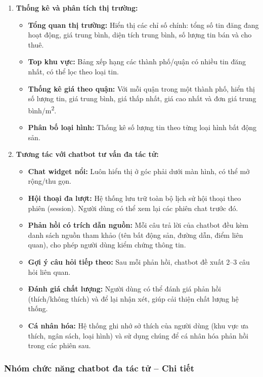 \begin{enumerate}
    \item \textbf{Thống kê và phân tích thị trường:}
    \begin{itemize}
        \item \textbf{Tổng quan thị trường:} Hiển thị các chỉ số chính: tổng số tin đăng đang hoạt động, giá trung bình, diện tích trung bình, số lượng tin bán và cho thuê.
        \item \textbf{Top khu vực:} Bảng xếp hạng các thành phố/quận có nhiều tin đăng nhất, có thể lọc theo loại tin.
        \item \textbf{Thống kê giá theo quận:} Với mỗi quận trong một thành phố, hiển thị số lượng tin, giá trung bình, giá thấp nhất, giá cao nhất và đơn giá trung bình/m\textsuperscript{2}.
        \item \textbf{Phân bố loại hình:} Thống kê số lượng tin theo từng loại hình bất động sản.
    \end{itemize}

    \item \textbf{Tương tác với chatbot tư vấn đa tác tử:}
    \begin{itemize}
        \item \textbf{Chat widget nổi:} Luôn hiển thị ở góc phải dưới màn hình, có thể mở rộng/thu gọn.
        \item \textbf{Hội thoại đa lượt:} Hệ thống lưu trữ toàn bộ lịch sử hội thoại theo phiên (session). Người dùng có thể xem lại các phiên chat trước đó.
        \item \textbf{Phản hồi có trích dẫn nguồn:} Mỗi câu trả lời của chatbot đều kèm danh sách nguồn tham khảo (tên bất động sản, đường dẫn, điểm liên quan), cho phép người dùng kiểm chứng thông tin.
        \item \textbf{Gợi ý câu hỏi tiếp theo:} Sau mỗi phản hồi, chatbot đề xuất 2--3 câu hỏi liên quan.
        \item \textbf{Đánh giá chất lượng:} Người dùng có thể đánh giá phản hồi (thích/không thích) và để lại nhận xét, giúp cải thiện chất lượng hệ thống.
        \item \textbf{Cá nhân hóa:} Hệ thống ghi nhớ sở thích của người dùng (khu vực ưa thích, ngân sách, loại hình) và sử dụng chúng để cá nhân hóa phản hồi trong các phiên sau.
    \end{itemize}
\end{enumerate}

\subsubsection{Nhóm chức năng chatbot đa tác tử -- Chi tiết}

